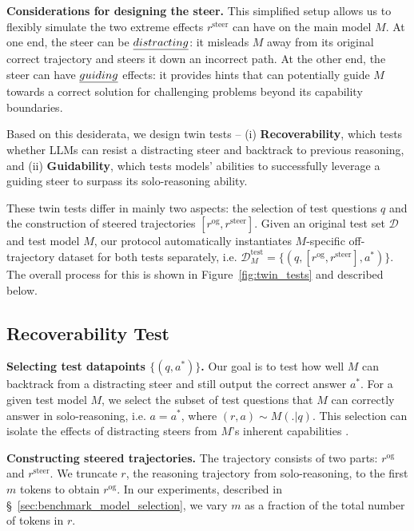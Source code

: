 \documentclass{article} %
\begin{document}
\textbf{Considerations for designing the steer.} This simplified setup allows us to flexibly simulate the two extreme effects $r^\mathrm{steer}$ can have on the main model $M$. At one end, the steer can be $\emph{distracting}$: it misleads $M$ away from its original correct trajectory and steers it down an incorrect path. At the other end, the steer can have $\emph{guiding}$ effects: it provides hints that can potentially guide $M$ towards a correct solution for challenging problems beyond its capability boundaries. 

Based on this desiderata, we design twin tests -- (i) \textbf{Recoverability}, which tests whether LLMs can  resist a distracting steer and backtrack to previous reasoning, and (ii) \textbf{Guidability}, which tests models' abilities to successfully leverage a guiding steer to surpass its solo-reasoning ability. 

These twin tests differ in mainly two aspects: the selection of test questions $q$ and the construction of steered trajectories $[r^\mathrm{og}, r^\mathrm{steer}]$. Given an original test set $\mathcal{D}$ and test model $M$, our protocol automatically instantiates $M$-specific off-trajectory dataset for both tests separately, i.e. $\mathcal{D}_M^\text{test} = \{(q, [r^\mathrm{og}, r^\mathrm{steer}], a^*)\}$. The overall process for this is shown in Figure~\ref{fig:twin_tests} and described below. 


\subsection{Recoverability Test}
\label{sec:recoverability_math}

\textbf{Selecting test datapoints \boldmath$\{(q, a^*)\}$.} Our goal is to test how well $M$ can backtrack from a distracting steer and still output the correct answer $a^*$. For a given test model $M$, we select the subset of test questions that $M$ can correctly answer in solo-reasoning, i.e. $a = a^*$, where $(r, a) \sim M(.|q)$. This selection can isolate the effects of distracting steers from $M$'s inherent capabilities .


\textbf{Constructing steered trajectories.} The trajectory consists of two parts: $r^\mathrm{og}$ and $r^\mathrm{steer}$. 
We truncate $r$, the reasoning trajectory from solo-reasoning, to the first $m$ tokens to obtain $r^\mathrm{og}$. In our experiments, described in \S~\ref{sec:benchmark_model_selection}, we vary $m$ as a fraction of the total number of tokens in $r$.
\end{document}

